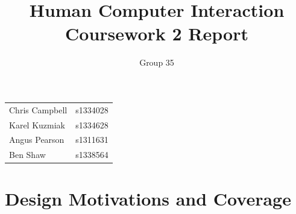 \documentclass[a4paper, notoc]{tufte-handout}
\title{Human Computer Interaction\\ Coursework 2 Report}
\author{Group 35}
\begin{document}
\maketitle %
\vspace{1em}
\noindent
\begin{tabular}{l r}
  Chris Campbell & s1334028\\
  Karel Kuzmiak  & s1334628\\
  Angus Pearson  & s1311631\\
  Ben Shaw       & s1338564\\
\end{tabular}



\section{Design Motivations and Coverage}

\end{document}
